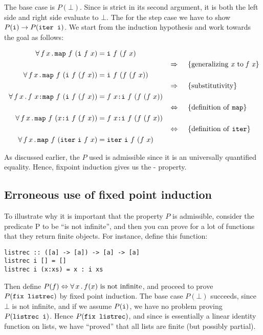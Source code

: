 The base case is $P(\bot)$. Since  is strict in its second
argument, it is both the left side and right side evaluate to $\bot$.
The for the step case we have to show
$P(\hs{i}) \rightarrow P(\hs{iter i})$. We start from the induction
hypothesis and work towards the goal as follows:

\begin{align*}
\w \faa{f}{x} \hs{map} \w f \w (\hs{i} \w f \w x) & \eq \hs{i} \w f \w (f \w x) \\
\descra{generalizing \w \mathit{x} \w to \w \mathit{f \w x}} \\
\w \faa{f}{x} \hs{map} \w f \w (\hs{i} \w f \w (f \w x)) & \eq \hs{i} \w f \w (f \w (f \w x)) \\
\descra{substitutivity} \\
\w \faa{f}{x} f \w x \hs{:} \hs{map} \w f \w (\hs{i} \w f \w (f \w x)) & \eq f \w x \hs{:} \hs{i} \w f \w (f \w (f \w x)) \\
\desclra{definition \w of \w \hs{map}} \\
\w \faa{f}{x} \hs{map} \w f \w (x \hs{:} \hs{i} \w f \w (f \w x)) & \eq f \w x \hs{:} \hs{i} \w f \w (f \w (f \w x)) \\
\desclra{definition \w of \w \hs{iter}} \\
\w \faa{f}{x} \hs{map} \w f \w (\hs{iter} \w \hs{i} \w f \w x) & \eq \hs{iter} \w \hs{i} \w f \w (f \w x) \\
\end{align*}

As discussed earlier, the $P$ used is admissible since it is an
universally quantified equality. Hence, fixpoint induction gives us the
- property.

\subsection{Erroneous use of fixed point induction}

To illustrate why it is important that the property $P$ is admissible,
consider the predicate P to be “is not infinite”, and then you can
prove for a lot of functions that they return finite objects. For
instance, define this function:

\begin{verbatim}
listrec :: ([a] -> [a]) -> [a] -> [a]
listrec i [] = []
listrec i (x:xs) = x : i xs
\end{verbatim}

Then define
$P(f) \Leftrightarrow \forall \, x \, . \, f(x) \,\, \mathrm{is \,\, not \,\, infinite}$,
and proceed to prove $P(\hs{fix listrec})$ by fixed point induction. The
base case $P(\bot)$ succeeds, since $\bot$ is not infinite, and if we
assume $P(\hs{i})$, we have no problem proving $P(\hs{listrec i})$.
Hence $P(\hs{fix listrec})$, and since  is essentially
a linear identity function on lists, we have ``proved'' that all lists
are finite (but possibly partial).

